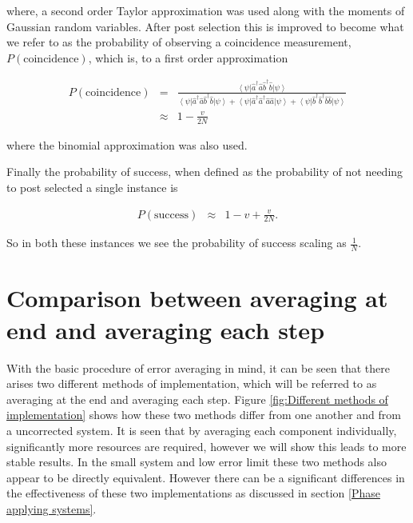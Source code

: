 \documentclass[aps,pra,twocolumn,superscriptaddress,numerical]{revtex4-1}
\begin{document}
		
		where, a second order Taylor approximation was used along with the moments of Gaussian random variables. After post selection this is improved to become what we refer to as the probability of observing a coincidence measurement, $P(\textrm{coincidence})$, which is, to a first order approximation
		
		\begin{widetext}
			\begin{eqnarray}
				P(\textrm{coincidence}) & = & \frac{\left\langle \psi\right|\hat{a}^{\dagger}\hat{a}\hat{b}^{\dagger}\hat{b}\left|\psi\right\rangle }{\left\langle \psi\right|\hat{a}^{\dagger}\hat{a}\hat{b}^{\dagger}\hat{b}\left|\psi\right\rangle +{}\left\langle \psi\right|\hat{a}^{\dagger}\hat{a}^{\dagger}\hat{a}\hat{a}\left|\psi\right\rangle +{}\left\langle \psi\right|\hat{b}^{\dagger}\hat{b}^{\dagger}\hat{b}\hat{b}\left|\psi\right\rangle }\nonumber \\
				& \approx & 1-\frac{v}{2N}\label{eq:2pNarb PS}
			\end{eqnarray}
		\end{widetext}
		
		where the binomial approximation was also used.
		
		Finally the probability of success, when defined as the probability of not needing to post selected a single instance is
		
		
		\begin{eqnarray}
			P(\textrm{success}) & \approx & 1-v+\frac{v}{2N}.\label{eq:2pNarb Success}
		\end{eqnarray}
	
		So in both these instances we see the probability of success scaling as $\frac{1}{N}$.
		
	\section{Comparison between averaging at end and averaging each step\label{averaging at end vs step}}
	
		With the basic procedure of error averaging in mind, it can be seen	that there arises two different methods of implementation, which will be referred to as averaging at the end and averaging each step. Figure \ref{fig:Different methods of implementation} shows how these two methods differ from one another and from a uncorrected	system. It is seen that by averaging each component individually, significantly more resources are required, however we will show this leads to more stable results. In the small system and low error limit these two methods also appear to be directly equivalent. However there can be a significant differences in the effectiveness of these two implementations as discussed in section \ref{Phase applying systems}.
	
\end{document}
